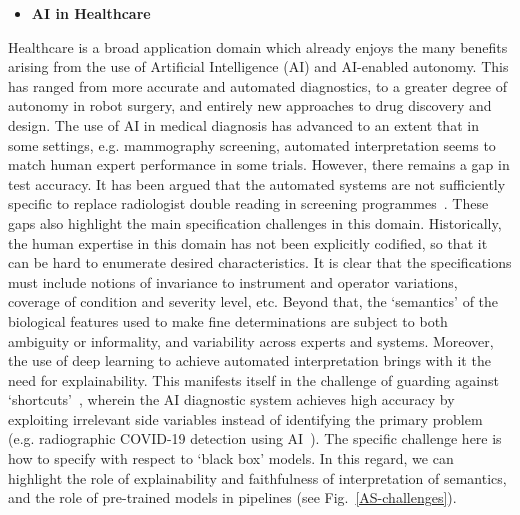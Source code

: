 \documentclass[sigconf,nonacm]{acmart}%
\begin{document}
	\begin{itemize}[leftmargin=0.5cm]
		\item \textbf{AI in Healthcare}
	\end{itemize}
	Healthcare is a broad application domain which already enjoys the many benefits arising from the use of Artificial Intelligence (AI) and AI-enabled autonomy. This has ranged from more accurate and automated diagnostics, to a greater degree of autonomy in robot surgery, and entirely new approaches to drug discovery and design. The use of AI in medical diagnosis has advanced to an extent that in some settings, e.g. mammography screening, automated interpretation seems to match human expert performance in some trials. However, there remains a gap in test accuracy. It has been argued that the automated systems are not sufficiently specific to replace radiologist double reading in screening programmes~\cite{Freemann1872}. These gaps also highlight the main specification challenges in this domain. Historically, the human expertise in this domain has not been explicitly codified, so that it can be hard to enumerate desired characteristics. It is clear that the specifications must include notions of invariance to instrument and operator variations, coverage of condition and severity level, etc. Beyond that, the `semantics' of the biological features used to make fine determinations are subject to both ambiguity or informality, and variability across experts and systems. Moreover, the use of deep learning to achieve automated interpretation brings with it the need for explainability. This manifests itself in the challenge of guarding against `shortcuts'~\cite{degrave2021ai}, wherein the AI diagnostic system achieves high accuracy by exploiting irrelevant side variables instead of identifying the primary problem (e.g. radiographic COVID-19 detection using AI~\cite{degrave2021ai}). 
	The specific challenge here is how to specify with respect to `black box' models. In this regard, we can highlight the role of explainability and faithfulness of interpretation of semantics, and the role of pre-trained models in pipelines (see Fig.~\ref{AS-challenges}). 
	
\end{document}
